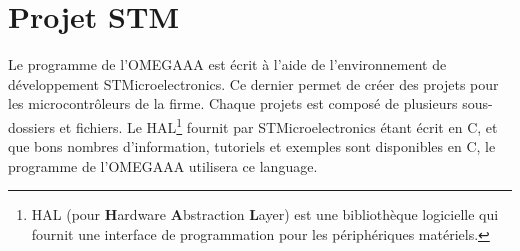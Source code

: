 \section{Projet STM}

Le programme de l'OMEGAAA est écrit à l'aide de l'environnement de développement
STMicroelectronics. Ce dernier permet de créer des projets pour les microcontrôleurs
de la firme. Chaque projets est composé de plusieurs sous-dossiers et fichiers. Le
HAL\footnote{HAL (pour \textbf{H}ardware \textbf{A}bstraction \textbf{L}ayer) est
une bibliothèque logicielle qui fournit une interface de programmation pour les
périphériques matériels.} fournit par STMicroelectronics étant écrit en C, et que
bons nombres d'information, tutoriels et exemples sont disponibles en C, le programme
de l'OMEGAAA utilisera ce language.


